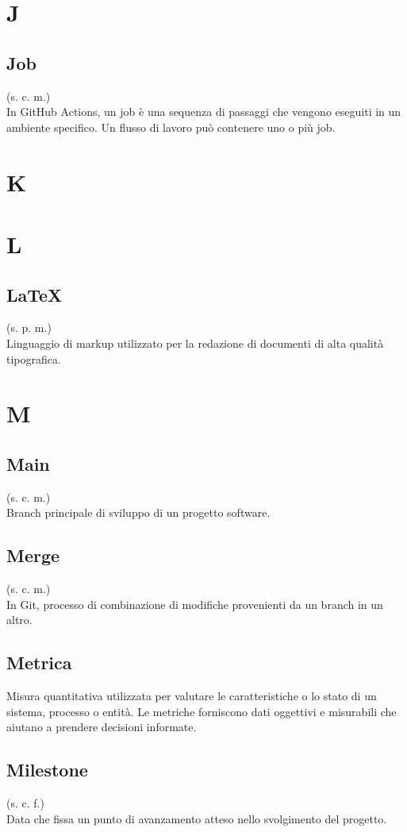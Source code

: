 \section{J}
    \subsection{Job}
    (s. c. m.)\\
    In GitHub Actions, un job è una sequenza di passaggi che vengono eseguiti
    in un ambiente specifico. Un flusso di lavoro può contenere uno o più job.
\pagebreak
\section{K}
\pagebreak
\section{L}
    \subsection{LaTeX}
    \label{LaTeX}
    (s. p. m.)\\
    Linguaggio di markup utilizzato per la redazione di documenti di alta qualità tipografica.
\pagebreak
\section{M}
    \subsection{Main}
    (s. c. m.)\\
    Branch principale di sviluppo di un progetto software.
    \subsection{Merge}
    (s. c. m.)\\
    In Git, processo di combinazione di modifiche provenienti da un branch in un altro.
    \subsection{Metrica}
    Misura quantitativa utilizzata per valutare le caratteristiche o lo stato di un sistema, processo o entità. 
    Le metriche forniscono dati oggettivi e misurabili che aiutano a prendere decisioni informate.
    \subsection{Milestone}
    (s. c. f.)\\
    Data che fissa un punto di avanzamento atteso nello svolgimento del progetto.
    \pagebreak
